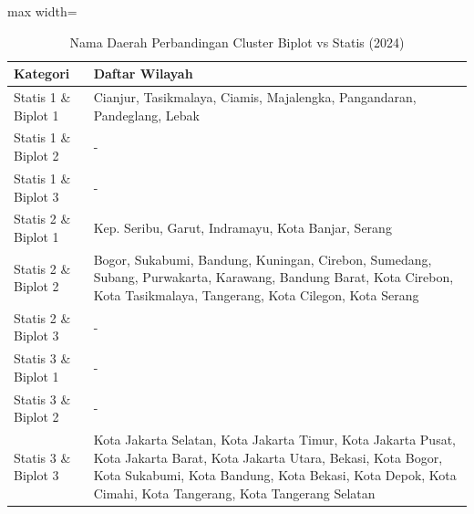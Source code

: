 \begin{table}[H]
\centering
\caption{Nama Daerah Perbandingan Cluster Biplot vs Statis (2024)} \label{tab:biplot_statis_name_2024}
\begin{adjustbox}{max width=\textwidth}
\begin{tabular}{|p{4cm}|p{10cm}|}
\hline
\textbf{Kategori} & \textbf{Daftar Wilayah} \\
\hline
Statis 1 \& Biplot 1 & Cianjur, Tasikmalaya, Ciamis, Majalengka, Pangandaran, Pandeglang, Lebak \\
\hline
Statis 1 \& Biplot 2 & - \\
\hline
Statis 1 \& Biplot 3 & - \\
\hline
Statis 2 \& Biplot 1 & Kep. Seribu, Garut, Indramayu, Kota Banjar, Serang \\
\hline
Statis 2 \& Biplot 2 & Bogor, Sukabumi, Bandung, Kuningan, Cirebon, Sumedang, Subang, Purwakarta, Karawang, Bandung Barat, Kota Cirebon, Kota Tasikmalaya, Tangerang, Kota Cilegon, Kota Serang \\
\hline
Statis 2 \& Biplot 3 & - \\
\hline
Statis 3 \& Biplot 1 & - \\
\hline
Statis 3 \& Biplot 2 & - \\
\hline
Statis 3 \& Biplot 3 & Kota Jakarta Selatan, Kota Jakarta Timur, Kota Jakarta Pusat, Kota Jakarta Barat, Kota Jakarta Utara, Bekasi, Kota Bogor, Kota Sukabumi, Kota Bandung, Kota Bekasi, Kota Depok, Kota Cimahi, Kota Tangerang, Kota Tangerang Selatan \\
\hline
\end{tabular}
\end{adjustbox}
\end{table}